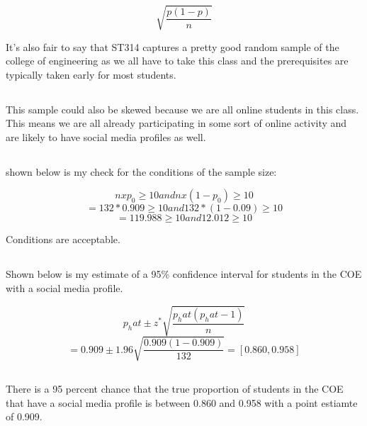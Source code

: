 \documentclass[letterpaper, onecolumn,10pt]{IEEEtran}
\begin{document}
            \[
                \sqrt{\dfrac{p(1-p)}{n}}
            \]
            
            It's also fair to say that ST314 captures a pretty good random sample of the college of engineering as we all have to take this class and the prerequisites are typically taken early for most students.\\
            
            \subsection{}
            This sample could also be skewed because we are all online students in this class. This means we are all already participating in some sort of online activity and are likely to have social media profiles as well.\\
            
            \subsection{}
            shown below is my check for the conditions of the sample size:
            
            \[
                n x p_0 \geq 10 and n x(1-p_0) \geq 10
            \]
            \[
                = 132*0.909 \geq 10 and 132 *(1-0.09) \geq 10
            \]
            \[
                = 119.988 \geq 10 and  12.012 \geq 10
            \]
            
            Conditions are acceptable.
            
            \subsection{}
            Shown below is my estimate of a 95\% confidence interval for students in the COE with a social media profile.
            
            \[
                p_hat \pm z^* \sqrt{\dfrac{p_hat(p_hat - 1)}{n}}
            \]
            \[
                = 0.909 \pm 1.96 \sqrt{\dfrac{0.909(1 - 0.909)}{132}} = [0.860, 0.958]
            \]
            
            \subsection{}
            There is a 95 percent chance that the true proportion of students in the COE that have a social media profile is between 0.860 and 0.958 with a point estiamte of 0.909.\\
            
		
\end{document}
